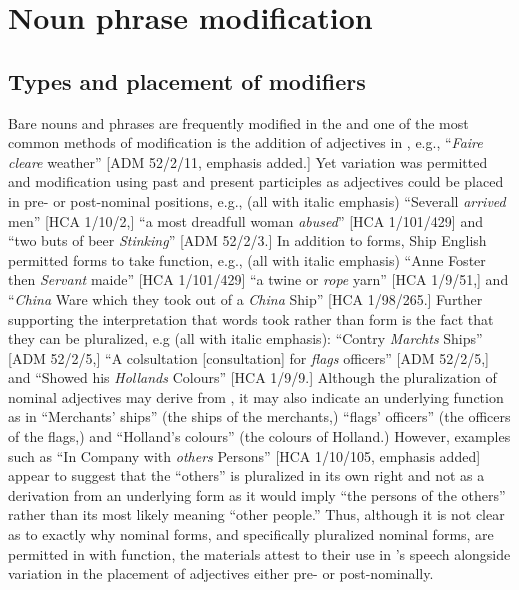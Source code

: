 \section{{Noun phrase modification} }%

\subsection{{Types and placement of modifiers}}%

Bare nouns and  phrases are frequently modified in the  and one of the most common methods of modification is the addition of adjectives in , e.g., “\textit{Faire cleare} weather” [ADM 52/2/11, emphasis added.] Yet variation was permitted and modification using past and present participles as adjectives could be placed in pre- or post-nominal positions, e.g., (all with italic emphasis) “Severall \textit{arrived} men” [HCA 1/10/2,] “a most dreadfull woman \textit{abused}” [HCA 1/101/429] and “two buts of beer \textit{Stinking}” [ADM 52/2/3.]  In addition to   forms, Ship English permitted  forms to take  function, e.g., (all with italic emphasis) “Anne Foster then \textit{Servant} maide” [HCA 1/101/429] “a twine or \textit{rope} yarn” [HCA 1/9/51,] and “\textit{China} Ware which they took out of a \textit{China} Ship” [HCA 1/98/265.] Further supporting the interpretation that  words took  rather than  form is the fact that they can be pluralized, e.g (all with italic emphasis): “Contry \textit{Marchts} Ships” [ADM 52/2/5,] “A colsultation [consultation] for \textit{flags} officers” [ADM 52/2/5,] and “Showed his \textit{Hollands} Colours” [HCA 1/9/9.] Although the pluralization of nominal adjectives may derive from , it may also indicate an underlying  function as in “Merchants’ ships” (the ships of the merchants,) “flags’ officers” (the officers of the flags,) and “Holland’s colours” (the colours of Holland.) However, examples such as “In Company with \textit{others} Persons” [HCA 1/10/105, emphasis added] appear to suggest that the  “others” is pluralized in its own right and not as a derivation from an underlying  form as it would imply “the persons of the others” rather than its most likely meaning “other people.” Thus, although it is not clear as to exactly why nominal forms, and specifically pluralized nominal forms, are permitted in  with  function, the  materials attest to their use in ’s speech alongside variation in the placement of  adjectives either pre- or post-nominally. 

